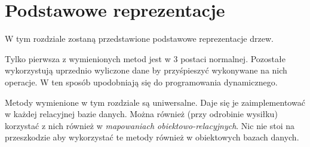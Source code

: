 \chapter{Podstawowe reprezentacje}

W tym rozdziale zostaną przedstawione podstawowe reprezentacje drzew.


Tylko pierwsza z wymienionych metod jest w 3 postaci normalnej.
Pozostałe wykorzystują uprzednio wyliczone dane by przyśpieszyć wykonywane na nich operacje.
W ten sposób upodobniają się do programowania dynamicznego.


Metody wymienione w tym rozdziale są uniwersalne.
Daje się je zaimplementować w każdej relacyjnej bazie danych. 
Można również (przy odrobinie wysiłku) korzystać z nich również w \emph{mapowaniach obiektowo-relacyjnych}.
Nic nie stoi na przeszkodzie aby wykorzystać te metody również w obiektowych bazach danych.


